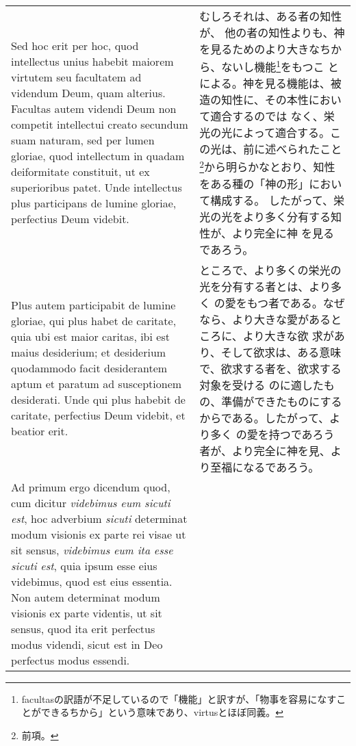 \documentclass[10pt]{jsarticle} %
\begin{document}
\begin{longtable}{p{21em}p{21em}}
\\

Sed hoc erit per
hoc, quod intellectus unius habebit maiorem virtutem seu facultatem ad
videndum Deum, quam alterius. Facultas autem videndi Deum non competit
intellectui creato secundum suam naturam, sed per lumen gloriae, quod
intellectum in quadam deiformitate constituit, ut ex superioribus
patet. Unde intellectus plus participans de lumine gloriae, perfectius
Deum videbit.

&

むしろそれは、ある者の知性が、
他の者の知性よりも、神を見るためのより大きなちから、ないし機能\footnote{facultasの訳語が不足しているので「機能」と訳すが、「物事を容易になすことができるちから」という意味であり、virtusとほぼ同義。}をもつこ
とによる。神を見る機能は、被造の知性に、その本性において適合するのでは
なく、栄光の光によって適合する。この光は、前に述べられたこと
\footnote{前項。}から明らかなとおり、知性をある種の「神の形」において構成する。
したがって、栄光の光をより多く分有する知性が、より完全に神
を見るであろう。

\\

Plus autem participabit de lumine gloriae, qui plus
habet de caritate, quia ubi est maior caritas, ibi est maius
desiderium; et desiderium quodammodo facit desiderantem aptum et
paratum ad susceptionem desiderati. Unde qui plus habebit de caritate,
perfectius Deum videbit, et beatior erit.

&

ところで、より多くの栄光の光を分有する者とは、より多く
の愛をもつ者である。なぜなら、より大きな愛があるところに、より大きな欲
求があり、そして欲求は、ある意味で、欲求する者を、欲求する対象を受ける
のに適したもの、準備ができたものにするからである。したがって、より多く
の愛を持つであろう者が、より完全に神を見、より至福になるであろう。

\\


{\sc Ad primum ergo dicendum} quod, cum dicitur {\it videbimus eum
sicuti est}, hoc adverbium {\it sicuti} determinat modum visionis ex
parte rei visae ut sit sensus, {\it videbimus eum ita esse sicuti
est}, quia ipsum esse eius videbimus, quod est eius essentia. Non
autem determinat modum visionis ex parte videntis, ut sit sensus, quod
ita erit perfectus modus videndi, sicut est in Deo perfectus modus
essendi.

&


\end{longtable}
\end{document}
